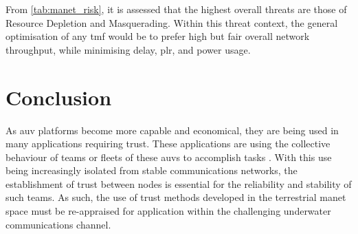 From \autoref{tab:manet_risk}, it is assessed that the highest overall threats are those of Resource Depletion and Masquerading.
Within this threat context, the general optimisation of any \gls{tmf} would be to prefer high but fair overall network throughput, while minimising delay, \gls{plr}, and power usage.

\section{Conclusion}

As \acrfull{auv} platforms become more capable and economical, they are being used in many applications requiring trust.
These applications are using the collective behaviour of teams or fleets of these \glspl{auv} to accomplish tasks \cite{Caiti2011}.
With this use being increasingly isolated from stable communications networks, the establishment of trust between nodes is essential for the reliability and stability of such teams.
As such, the use of trust methods developed in the terrestrial \gls{manet} space must be re-appraised for application within the challenging underwater communications channel.

